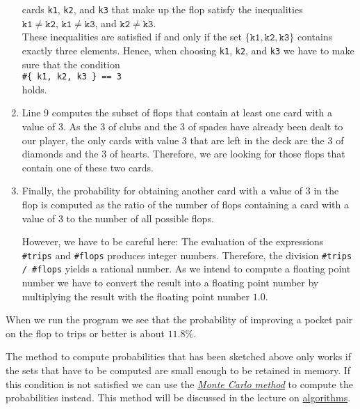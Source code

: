 \begin{enumerate}
      cards \texttt{k1}, \texttt{k2}, and \texttt{k3} that make up the flop satisfy the inequalities 
      \\[0.2cm]
      \hspace*{1.3cm}
      $\mathtt{k1} \not= \mathtt{k2}$, \quad $\mathtt{k1} \not= \mathtt{k3}$,  \quad and \quad $\mathtt{k2} \not= \mathtt{k3}$.
      \\[0.2cm]
      These inequalities are satisfied if and only if the set 
      $\{ \mathtt{k1}, \mathtt{k2}, \mathtt{k3} \}$ contains exactly three elements.  Hence, when
      choosing \texttt{k1}, \texttt{k2}, and \texttt{k3} we have to make sure that the condition
      \\[0.2cm]
      \hspace*{1.3cm}
      \texttt{\#\{ k1, k2, k3 \} == 3 }
      \\[0.2cm]
      holds.
\item Line 9 computes the subset of flops that contain at least one card with a value of 3.
      As the 3 of clubs and the 3 of spades have already been dealt to our player, the only cards
      with value 3 that are left in the deck are the 3 of diamonds and the 3 of hearts.  Therefore, we are looking for
      those flops that contain one of these two cards.
\item Finally, the probability for obtaining another card with a value of 3 in the flop is computed as
      the ratio of the number of flops containing a card with a value of 3 to the number of all possible flops.

      However, we have to be careful here:  The evaluation of the expressions
      \texttt{\#trips} and \texttt{\#flops} produces integer numbers.  Therefore, the division
      \texttt{\#trips / \#flops} yields a rational number.  As we intend to compute a floating point
      number we have to convert the result into a floating point number by multiplying the result
      with the floating point number $1.0$.
\end{enumerate}
When we run the program we see that the probability of improving a pocket pair on the flop to trips or better
is about  $11.8\%$.

\remarkEng
The method to compute probabilities that has been sketched above only works if the sets that have to
be computed are small enough to be retained in memory.  If this condition is
not satisfied we can use the \href{https://en.wikipedia.org/wiki/Monte_Carlo_method}{\emph{Monte Carlo method}} 
to compute the probabilities instead.  This method will be discussed in the lecture on 
\href{https://github.com/karlstroetmann/Algorithms/blob/master/Lecture-Notes/algorithms.pdf}{algorithms}.


